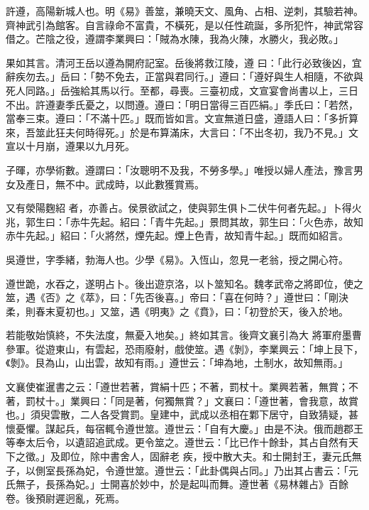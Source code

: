 \begin{pinyinscope}
 許遵，高陽新城人也。明《易》善筮，兼曉天文、風角、占相、逆刺，其驗若神。齊神武引為館客。自言祿命不富貴，不橫死，是以任性疏誕，多所犯忤，神武常容借之。芒陰之役，遵謂李業興曰：「賊為水陳，我為火陳，水勝火，我必敗。」



 果如其言。清河王岳以遵為開府記室。岳後將救江陵，遵
 曰：「此行必致後凶，宜辭疾勿去。」岳曰：「勢不免去，正當與君同行。」遵曰：「遵好與生人相隨，不欲與死人同路。」岳強給其馬以行。至都，尋喪。三臺初成，文宣宴會尚書以上，三日不出。許遵妻季氏憂之，以問遵。遵曰：「明日當得三百匹絹。」季氏曰：「若然，當奉三束。遵曰：「不滿十匹。」既而皆如言。文宣無道日盛，遵語人曰：「多折算來，吾筮此狂夫何時得死。」於是布算滿床，大言曰：「不出冬初，我乃不見。」文宣以十月崩，遵果以九月死。



 子暉，亦學術數。遵謂曰：「汝聰明不及我，不勞多學。」唯授以婦人產法，豫言男女及產日，無不中。武成時，以此數獲賞焉。



 又有滎陽麴紹
 者，亦善占。侯景欲試之，使與郭生俱卜二伏牛何者先起。」卜得火兆，郭生曰：「赤牛先起。紹曰：「青牛先起。」景問其故，郭生曰：「火色赤，故知赤牛先起。」紹曰：「火將然，煙先起。煙上色青，故知青牛起。」既而如紹言。



 吳遵世，字季緒，勃海人也。少學《易》。入恆山，忽見一老翁，授之開心符。



 遵世跪，水吞之，遂明占卜。後出遊京洛，以卜筮知名。魏孝武帝之將即位，使之筮，遇《否》之《萃》，曰：「先否後喜。」帝曰：「喜在何時？」遵世曰：「剛決柔，則春末夏初也。」又筮，遇《明夷》之《賁》，曰：「初登於天，後入於地。



 若能敬始慎終，不失法度，無憂入地矣。」終如其言。後齊文襄引為大
 將軍府墨曹參軍。從遊東山，有雲起，恐雨廢射，戲使筮。遇《剝》，李業興云：「坤上艮下，《剝》。艮為山，山出雲，故知有雨。」遵世云：「坤為地，土制水，故知無雨。」



 文襄使崔暹書之云：「遵世若著，賞絹十匹；不著，罰杖十。業興若著，無賞；不著，罰杖十。」業興曰：「同是著，何獨無賞？」文襄曰：「遵世著，會我意，故賞也。」須臾雲散，二人各受賞罰。皇建中，武成以丞相在鄴下居守，自致猜疑，甚懷憂懼。謀起兵，每宿輒令遵世筮。遵世云：「自有大慶。」由是不決。俄而趙郡王等奉太后令，以遺詔追武成。更令筮之。遵世云：「比已作十餘卦，其占自然有天下之徵。」及即位，除中書舍人，固辭老
 疾，授中散大夫。和士開封王，妻元氏無子，以側室長孫為妃，令遵世筮。遵世云：「此卦偶與占同。」乃出其占書云：「元氏無子，長孫為妃。」士開喜於妙中，於是起叫而舞。遵世著《易林雜占》百餘卷。後預尉遲迥亂，死焉。




\end{pinyinscope}
